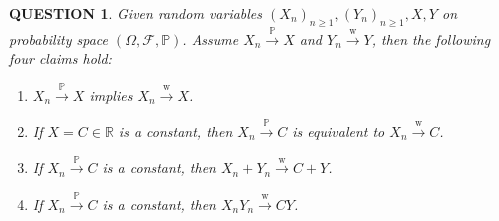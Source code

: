 \documentclass[12pt]{article}
\renewcommand{\(}{\left(}%
\renewcommand{\)}{\right)}%
\renewcommand{\[}{\left[}%
\renewcommand{\]}{\right]}%
\renewcommand{\r}{\mathbb{R}}
\newcommand{\p}{\mathbb{P}}
\newcommand{\f}{\mathscr{F}}
\newtheorem{question}{QUESTION}[section]}
\begin{document}
  \begin{question}
  	Given random variables $(X_n)_{n\geq 1},(Y_n)_{n\geq 1},X,Y$ on probability space $(\Omega,\f,\p)$. Assume $X_n\overset{\p}{\to} X$ and $Y_n\overset{\mathrm{w}}{\to}Y$, then the following four claims hold:
  	\begin{enumerate}
  		\item $X_n\overset{\p}{\to}X$ implies $X_n\overset{\mathrm{w}}{\to}X$.
  		\item If $X=C\in\r$ is a constant, then $X_n\overset{\p}{\to}C$ is equivalent to $X_n\overset{\mathrm{w}}{\to}C$.
  		\item If $X_n\overset{\p}{\to}C$ is a constant, then $X_n+Y_n\overset{\mathrm{w}}{\to}C+Y$.
  		\item If $X_n\overset{\p}{\to}C$ is a constant, then $X_nY_n\overset{\mathrm{w}}{\to}CY$.
  	\end{enumerate} 
  \end{question}
\end{document}
